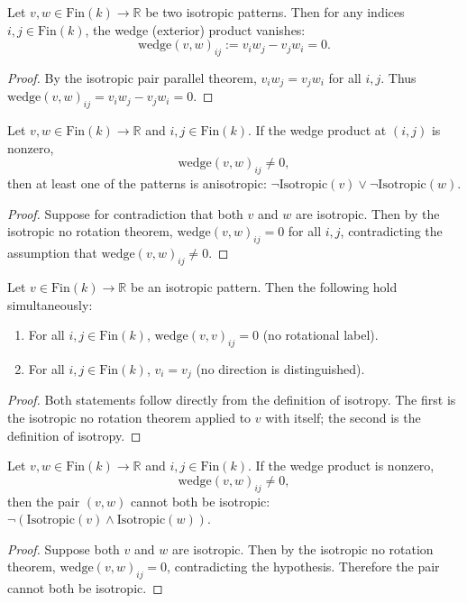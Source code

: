 \begin{theorem}
Let $v, w \in \text{Fin}(k) \to \mathbb{R}$ be two isotropic patterns. Then for any indices $i, j \in \text{Fin}(k)$, the wedge (exterior) product vanishes:
\[
\text{wedge}(v, w)_{ij} := v_i w_j - v_j w_i = 0.
\]
\begin{proof}
By the isotropic pair parallel theorem, $v_i w_j = v_j w_i$ for all $i, j$. Thus $\text{wedge}(v, w)_{ij} = v_i w_j - v_j w_i = 0$.
\end{proof}
\end{theorem}

\begin{theorem}
Let $v, w \in \text{Fin}(k) \to \mathbb{R}$ and $i, j \in \text{Fin}(k)$. If the wedge product at $(i,j)$ is nonzero,
\[
\text{wedge}(v, w)_{ij} \neq 0,
\]
then at least one of the patterns is anisotropic: $\neg \text{Isotropic}(v) \lor \neg \text{Isotropic}(w)$.
\begin{proof}
Suppose for contradiction that both $v$ and $w$ are isotropic. Then by the isotropic no rotation theorem, $\text{wedge}(v, w)_{ij} = 0$ for all $i, j$, contradicting the assumption that $\text{wedge}(v, w)_{ij} \neq 0$.
\end{proof}
\end{theorem}

\begin{theorem}
Let $v \in \text{Fin}(k) \to \mathbb{R}$ be an isotropic pattern. Then the following hold simultaneously:
\begin{enumerate}
\item For all $i, j \in \text{Fin}(k)$, $\text{wedge}(v, v)_{ij} = 0$ (no rotational label).
\item For all $i, j \in \text{Fin}(k)$, $v_i = v_j$ (no direction is distinguished).
\end{enumerate}
\begin{proof}
Both statements follow directly from the definition of isotropy. The first is the isotropic no rotation theorem applied to $v$ with itself; the second is the definition of isotropy.
\end{proof}
\end{theorem}

\begin{theorem}
Let $v, w \in \text{Fin}(k) \to \mathbb{R}$ and $i, j \in \text{Fin}(k)$. If the wedge product is nonzero,
\[
\text{wedge}(v, w)_{ij} \neq 0,
\]
then the pair $(v, w)$ cannot both be isotropic: $\neg(\text{Isotropic}(v) \land \text{Isotropic}(w))$.
\begin{proof}
Suppose both $v$ and $w$ are isotropic. Then by the isotropic no rotation theorem, $\text{wedge}(v, w)_{ij} = 0$, contradicting the hypothesis. Therefore the pair cannot both be isotropic.
\end{proof}
\end{theorem}

